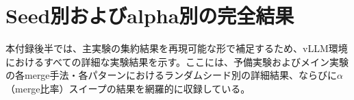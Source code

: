 \documentclass{article}
\begin{document}
\begin{table}[H]
\centering
\caption{各マージ手法の実測マージ時間とピークGPUメモリ(平均)}
\label{tab:gpu}
\small
{}
\end{table}

\FloatBarrier

\section{Seed別およびalpha別の完全結果}
\label{sec:Seed別およびalpha別の完全結果}

本付録後半では、主実験の集約結果を再現可能な形で補足するため、vLLM環境におけるすべての詳細な実験結果を示す。ここには、予備実験およびメイン実験の各merge手法・各パターンにおけるランダムシード別の詳細結果、ならびに$\alpha$（merge比率）スイープの結果を網羅的に収録している。


\newpage
\end{document}
